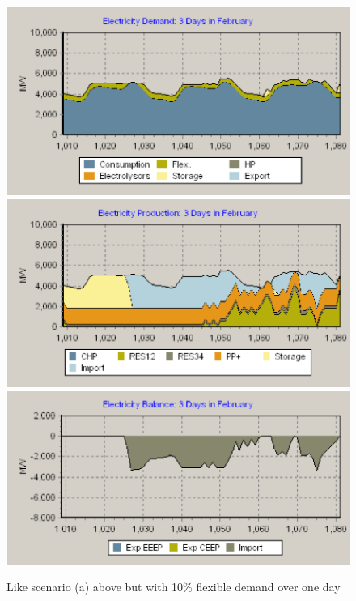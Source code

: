 \begin{appendices}
  \begin{figure}[htbp]
    \centering
    \centering
    \includegraphics[scale=1.4]{figures/B12-3day-demand.png}
    \includegraphics[scale=1.4]{figures/B12-3day-production.png}
    \includegraphics[scale=1.4]{figures/B12-3day-balance.png}
    \caption{Like scenario (a) above but with 10\% flexible demand over one day}
    \label{app:B12}
  \end{figure}


\end{appendices}
